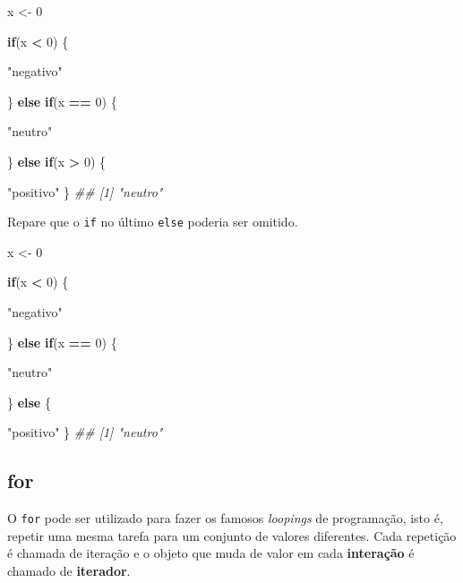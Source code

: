 \documentclass[]{book}
\newenvironment{Shaded}{\begin{snugshade}}{\end{snugshade}}
\newcommand{\CommentTok}[1]{\textcolor[rgb]{0.56,0.35,0.01}{\textit{#1}}}
\newcommand{\ControlFlowTok}[1]{\textcolor[rgb]{0.13,0.29,0.53}{\textbf{#1}}}
\newcommand{\DecValTok}[1]{\textcolor[rgb]{0.00,0.00,0.81}{#1}}
\newcommand{\NormalTok}[1]{#1}
\newcommand{\OperatorTok}[1]{\textcolor[rgb]{0.81,0.36,0.00}{\textbf{#1}}}
\newcommand{\StringTok}[1]{\textcolor[rgb]{0.31,0.60,0.02}{#1}}
\begin{document}
\begin{Shaded}
\begin{Highlighting}[]
\NormalTok{x <-}\StringTok{ }\DecValTok{0}

\ControlFlowTok{if}\NormalTok{(x }\OperatorTok{<}\StringTok{ }\DecValTok{0}\NormalTok{) \{}
  
  \StringTok{"negativo"}
  
\NormalTok{\} }\ControlFlowTok{else} \ControlFlowTok{if}\NormalTok{(x }\OperatorTok{==}\StringTok{ }\DecValTok{0}\NormalTok{) \{}
  
  \StringTok{"neutro"}
  
\NormalTok{\} }\ControlFlowTok{else} \ControlFlowTok{if}\NormalTok{(x }\OperatorTok{>}\StringTok{ }\DecValTok{0}\NormalTok{) \{}
  
  \StringTok{"positivo"}
\NormalTok{\}}
\CommentTok{## [1] "neutro"}
\end{Highlighting}
\end{Shaded}

Repare que o \texttt{if} no último \texttt{else} poderia ser omitido.

\begin{Shaded}
\begin{Highlighting}[]
\NormalTok{x <-}\StringTok{ }\DecValTok{0}

\ControlFlowTok{if}\NormalTok{(x }\OperatorTok{<}\StringTok{ }\DecValTok{0}\NormalTok{) \{}
  
  \StringTok{"negativo"}
  
\NormalTok{\} }\ControlFlowTok{else} \ControlFlowTok{if}\NormalTok{(x }\OperatorTok{==}\StringTok{ }\DecValTok{0}\NormalTok{) \{}
  
  \StringTok{"neutro"}
  
\NormalTok{\} }\ControlFlowTok{else}\NormalTok{ \{}
  
  \StringTok{"positivo"}
\NormalTok{\}}
\CommentTok{## [1] "neutro"}
\end{Highlighting}
\end{Shaded}

\hypertarget{for}{%
\subsection{for}\label{for}}

O \texttt{for} pode ser utilizado para fazer os famosos \emph{loopings} de programação, isto é, repetir uma mesma tarefa para um conjunto de valores diferentes. Cada repetição é chamada de iteração e o objeto que muda de valor em cada \textbf{interação} é chamado de \textbf{iterador}.
\end{document}
